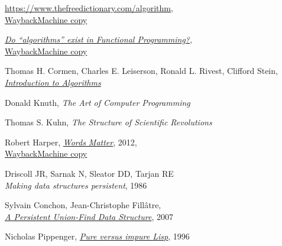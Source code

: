 \documentclass[declaration,mgr,english,shortabstract]{iithesis}
\begin{document}


\newcommand{\wayback}[1]{\href{#1}{WaybackMachine copy}}

\begin{thebibliography}{1}

    \url{https://www.thefreedictionary.com/algorithm}, \\
    \wayback{https://web.archive.org/web/20210320000535/https://www.thefreedictionary.com/algorithm}

    \href{https://stackoverflow.com/questions/25940327/do-algorithms-exist-in-functional-programming}{\textit{Do ``algorithms'' exist in Functional Programming?}}, \\
    \wayback{https://web.archive.org/web/20210320000834/https://stackoverflow.com/questions/25940327/do-algorithms-exist-in-functional-programming}

    Thomas H. Cormen, Charles E. Leiserson, Ronald L. Rivest, Clifford Stein, \\
    \href{http://ressources.unisciel.fr/algoprog/s00aaroot/aa00module1/res/%5BCormen-AL2011%5DIntroduction_To_Algorithms-A3.pdf}{\textit{Introduction to Algorithms}}

    Donald Knuth,
    \textit{The Art of Computer Programming}

    Thomas S. Kuhn,
    \textit{The Structure of Scientific Revolutions}

    Robert Harper,
    \href{https://existentialtype.wordpress.com/2012/02/01/words-matter/}{\textit{Words Matter}}, 2012, \\
    \wayback{https://web.archive.org/web/20210320001018/https://existentialtype.wordpress.com/2012/02/01/words-matter/}

    Driscoll JR, Sarnak N, Sleator DD, Tarjan RE \\
    \textit{Making data structures persistent}, 1986

    Sylvain Conchon, Jean-Christophe Fillâtre, \\
    \href{https://www.lri.fr/~filliatr/ftp/publis/puf-wml07.pdf}{\textit{A Persistent Union-Find Data Structure}}, 2007

    Nicholas Pippenger,
    \href{https://www.cs.princeton.edu/courses/archive/fall03/cs528/handouts/Pure%20Versus%20Impure%20LISP.pdf}{\textit{Pure versus impure Lisp}}, 1996


\end{thebibliography}
\end{document}
